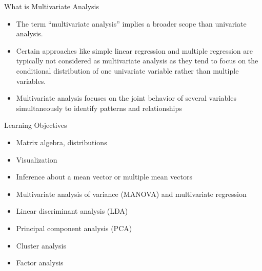 \documentclass[
  ignorenonframetext,
]{beamer}
\providecommand{\tightlist}{%
  \setlength{\itemsep}{0pt}\setlength{\parskip}{0pt}}
\begin{document}
\begin{frame}{What is Multivariate Analysis}
\protect\hypertarget{what-is-multivariate-analysis}{}
\begin{itemize}
\tightlist
\item
  The term ``multivariate analysis'' implies a broader scope than
  univariate analysis.
\item
  Certain approaches like simple linear regression and multiple
  regression are typically not considered as multivariate analysis as
  they tend to focus on the conditional distribution of one univariate
  variable rather than multiple variables.
\item
  Multivariate analysis focuses on the joint behavior of several
  variables simultaneously to identify patterns and relationships
\end{itemize}
\end{frame}

\begin{frame}{Learning Objectives}
\protect\hypertarget{learning-objectives}{}
\begin{itemize}
\tightlist
\item
  Matrix algebra, distributions
\item
  Visualization
\item
  Inference about a mean vector or multiple mean vectors
\item
  Multivariate analysis of variance (MANOVA) and multivariate regression
\item
  Linear discriminant analysis (LDA)
\item
  Principal component analysis (PCA)
\item
  Cluster analysis
\item
  Factor analysis
\end{itemize}
\end{frame}
\end{document}
